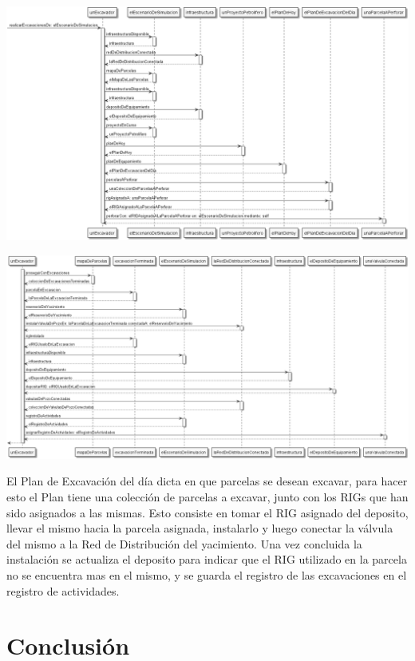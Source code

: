 \documentclass[10pt,a4paper]{article}
\begin{document}
\centerline{\includegraphics[scale=0.325]{images/secuenciaExcavacion1.png}}
\vspace{0.25cm}
\centerline{\includegraphics[scale=0.325]{images/secuenciaExcavacion2.png}}

El Plan de Excavación del día dicta en que parcelas se desean excavar, para hacer esto el Plan tiene una colección de parcelas a excavar, junto con los RIGs que han sido asignados a las mismas. Esto consiste en tomar el RIG asignado del deposito, llevar el mismo hacia la parcela asignada, instalarlo y luego conectar la válvula del mismo a la Red de Distribución del yacimiento. Una vez concluida la instalación se actualiza el deposito para indicar que el RIG utilizado en la parcela no se encuentra mas en el mismo, y se guarda el registro de las excavaciones en el registro de actividades.

\pagebreak

\section{Conclusión}
\end{document}
